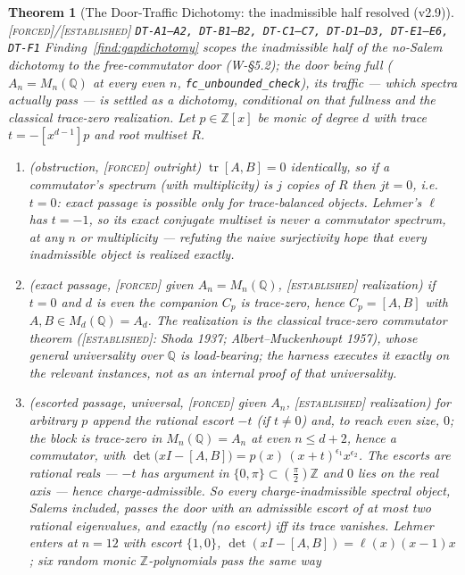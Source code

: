 \documentclass[11pt]{article}
\newcommand{\tagF}{\textcolor{cF}{\textsc{[forced]}}}
\newcommand{\tagE}{\textcolor{cE}{\textsc{[established]}}}
\newcommand{\hx}[1]{\textcolor{cC}{\footnotesize\texttt{#1}}}
\newcommand{\Q}{\mathbb{Q}}
\newcommand{\Z}{\mathbb{Z}}
\theoremstyle{plain}
\newtheorem{theorem}{Theorem}[section]
\theoremstyle{definition}
\theoremstyle{remark}
\begin{document}
\begin{theorem}[The Door-Traffic Dichotomy: the inadmissible half resolved (v2.9)]\label{thm:doortraffic}\tagF{}/\tagE{} \hx{DT-A1--A2, DT-B1--B2, DT-C1--C7, DT-D1--D3, DT-E1--E6, DT-F1}
Finding~\ref{find:gapdichotomy} scopes the inadmissible half of the no-Salem
dichotomy to the free-commutator door (W-\S5.2); the door being \emph{full}
($A_n=M_n(\Q)$ at every even $n$, \texttt{fc\_unbounded\_check}), its \emph{traffic}
--- which spectra actually pass --- is settled as a dichotomy, conditional on that
fullness and the classical trace-zero realization. Let $p\in\Z[x]$ be monic of
degree $d$ with trace $t=-[x^{d-1}]p$ and root multiset $R$.
\begin{enumerate}[nosep,label=(\alph*),leftmargin=2.2em]
\item\emph{(obstruction, \tagF{} outright)} $\operatorname{tr}[A,B]=0$ identically,
so if a commutator's spectrum (with multiplicity) is $j$ copies of $R$ then $jt=0$,
i.e.\ $t=0$: \emph{exact} passage is possible only for trace-balanced objects.
Lehmer's $\ell$ has $t=-1$, so its exact conjugate multiset is \emph{never} a
commutator spectrum, at any $n$ or multiplicity --- refuting the naive surjectivity
hope that every inadmissible object is realized \emph{exactly}.
\item\emph{(exact passage, \tagF{} given $A_n=M_n(\Q)$, \tagE{} realization)} if
$t=0$ and $d$ is even the companion $C_p$ is trace-zero, hence $C_p=[A,B]$ with
$A,B\in M_d(\Q)=A_d$. The realization is the classical trace-zero commutator theorem
(\emph{\tagE{}: Shoda 1937; Albert--Muckenhoupt 1957}), whose general universality
over $\Q$ is \emph{load-bearing}; the harness executes it exactly on the relevant
instances, not as an internal proof of that universality.
\item\emph{(escorted passage, universal, \tagF{} given $A_n$, \tagE{} realization)}
for arbitrary $p$ append the rational escort $-t$ (if $t\neq0$) and, to reach even
size, $0$; the block is trace-zero in $M_n(\Q)=A_n$ at even $n\le d+2$, hence a
commutator, with $\det\!\bigl(xI-[A,B]\bigr)=p(x)\,(x+t)^{\epsilon_1}x^{\epsilon_2}$.
The escorts are rational reals --- $-t$ has argument in $\{0,\pi\}\subset(\tfrac\pi2)\Z$
and $0$ lies on the real axis --- hence charge-admissible. So \emph{every}
charge-inadmissible spectral object, Salems included, passes the door with an
admissible escort of at most two rational eigenvalues, and \emph{exactly} (no
escort) iff its trace vanishes. Lehmer enters at $n=12$ with escort $\{1,0\}$,
$\det(xI-[A,B])=\ell(x)(x-1)x$; six random monic $\Z$-polynomials pass the same way

\end{enumerate}
\end{theorem}
\end{document}
